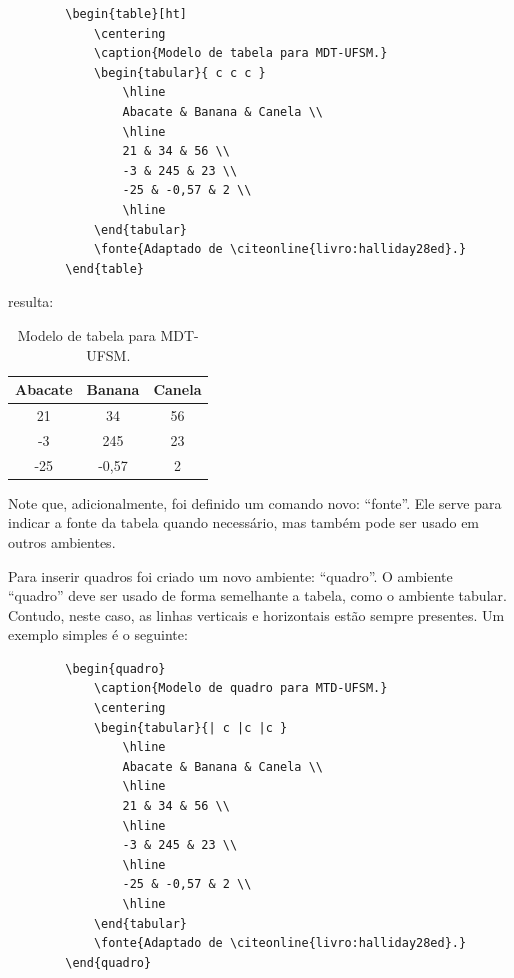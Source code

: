 \documentclass[oneside,openright,12pt]{ufsm_2021} %
\begin{document}
	\begin{verbatim}
		\begin{table}[ht]
			\centering
			\caption{Modelo de tabela para MDT-UFSM.}
			\begin{tabular}{ c c c }
				\hline
				Abacate & Banana & Canela \\
				\hline
				21 & 34 & 56 \\
				-3 & 245 & 23 \\
				-25 & -0,57 & 2 \\
				\hline
			\end{tabular}
			\fonte{Adaptado de \citeonline{livro:halliday28ed}.}
		\end{table}
	\end{verbatim}
	
	\noindent resulta:
	
	\begin{table}[ht]
		\centering
		\caption{Modelo de tabela para MDT-UFSM.}
		\begin{tabular}{ c c c }
			\hline
			Abacate & Banana & Canela \\
			\hline
			21 & 34 & 56 \\
			-3 & 245 & 23 \\
			-25 & -0,57 & 2 \\
			\hline
		\end{tabular}
	\end{table}
	
	\par Note que, adicionalmente, foi definido um comando novo: ``fonte''. Ele serve para indicar a fonte da tabela quando necessário, mas também pode ser usado em outros ambientes.
	
	\par Para inserir quadros foi criado um novo ambiente: ``quadro''. O ambiente ``quadro'' deve ser usado de forma semelhante a tabela, como o ambiente tabular. Contudo, neste caso, as linhas verticais e horizontais estão sempre presentes. Um exemplo simples é o seguinte: 
	
	
	\begin{verbatim}
		\begin{quadro}
			\caption{Modelo de quadro para MTD-UFSM.}
			\centering
			\begin{tabular}{| c |c |c }
				\hline
				Abacate & Banana & Canela \\
				\hline
				21 & 34 & 56 \\
				\hline
				-3 & 245 & 23 \\
				\hline
				-25 & -0,57 & 2 \\
				\hline
			\end{tabular}
			\fonte{Adaptado de \citeonline{livro:halliday28ed}.}
		\end{quadro}
	\end{verbatim}
	
\end{document}
